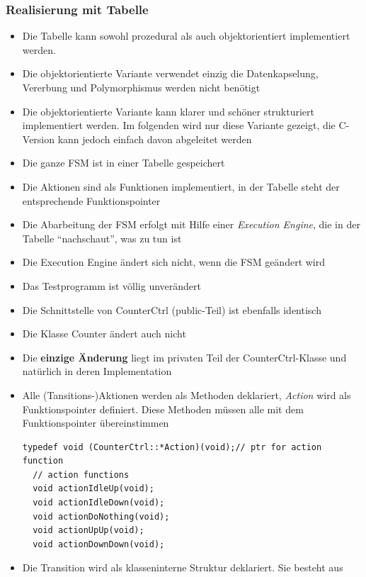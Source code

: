\subsubsection{Realisierung mit Tabelle}
\begin{itemize}
  \item Die Tabelle kann sowohl prozedural als auch objektorientiert implementiert werden.
  \item Die objektorientierte Variante verwendet einzig die Datenkapselung,
        Vererbung und Polymorphismus werden nicht benötigt
  \item Die objektorientierte Variante kann klarer und schöner strukturiert
        implementiert werden. Im folgenden wird nur diese Variante gezeigt, die
        C-Version kann jedoch einfach davon abgeleitet werden
  \item Die ganze FSM ist in einer Tabelle gespeichert
  \item Die Aktionen sind als Funktionen implementiert, in der Tabelle steht der
        entsprechende Funktionspointer
  \item Die Abarbeitung der FSM erfolgt mit Hilfe einer \textit{Execution
        Engine}, die in der Tabelle "`nachschaut"', was zu tun ist
  \item Die Execution Engine ändert sich nicht, wenn die FSM geändert wird
  \item Das Testprogramm ist völlig unverändert
  \item Die Schnittstelle von CounterCtrl (public-Teil) ist ebenfalls identisch
  \item Die Klasse Counter ändert auch nicht
  \item Die \textbf{einzige Änderung} liegt im privaten Teil der
        CounterCtrl-Klasse und natürlich in deren Implementation
  \item Alle (Tansitions-)Aktionen werden als Methoden deklariert,
  \textit{Action} wird als Funktionspointer definiert. Diese Methoden müssen
  alle mit dem Funktionspointer übereinstimmen
 \begin{lstlisting}[style=Cpp]
 typedef void (CounterCtrl::*Action)(void);// ptr for action function
  // action functions 
  void actionIdleUp(void); 
  void actionIdleDown(void); 
  void actionDoNothing(void); 
  void actionUpUp(void); 
  void actionDownDown(void);
 \end{lstlisting}
 \item Die Transition wird als klasseninterne Struktur deklariert. Sie besteht
 aus
 \begin{itemize}

\end{itemize}
\end{itemize}
